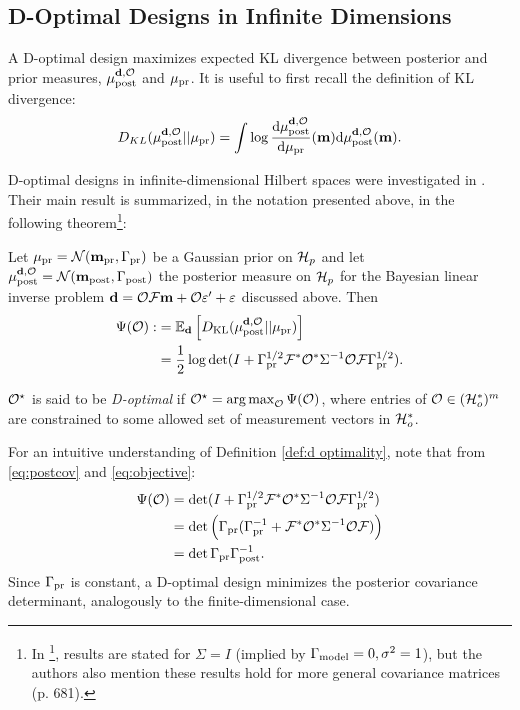 \subsection{D-Optimal Designs in Infinite Dimensions}\label{subsec:D optimal design} 
A D-optimal design maximizes expected KL divergence between posterior
and prior measures, $\mu_{\textup{post}}^{\mathbf{d}, \mathcal{O}}$ and $\mu_{\textup{pr}}$. It is useful to first recall
the definition of KL divergence:%
$$
D_{KL}(\mu_{\textup{post}}^{\mathbf{d}, \mathcal{O}}||\mu_{\textup{pr}}) = \int \log \frac{\text{\textup{d}} \mu_{\textup{post}}^{\mathbf{d}, \mathcal{O}}}{\text{\textup{d}} \mu_{\textup{pr}}}(\mathbf{m}) \text{\textup{d}} \mu_{\textup{post}}^{\mathbf{d}, \mathcal{O}}(\mathbf{m}).
$$

D-optimal designs in infinite-dimensional Hilbert spaces were
investigated in \cite{AlexanderianGloorGhattas14}. Their main result
is summarized, in the notation presented above, in the following
theorem\footnote{In \cite{AlexanderianGloorGhattas14}\footnote{A
similar theorem appears in \cite[Theorem
  1]{alexanderian2018efficient}.}, results are stated for $\Sigma=I$
(implied by $\Gamma_{\textup{model}} = 0,\sigma^2=1$), but the authors also mention
these results hold for more general covariance matrices (p. 681).}:
\begin{theorem}\label{thm:d optimality}
  Let $\mu_{\textup{pr}} = \mathcal{N}(\mathbf{m}_{\textup{pr}},\Gamma_{\textup{pr}})$ be a Gaussian prior on $\mathcal{H}_p$
  and let $\mu_{\textup{post}}^{\mathbf{d}, \mathcal{O}} = \mathcal{N}(\mathbf{m}_{\textup{post}},\Gamma_{\textup{post}})$ the posterior measure
  on $\mathcal{H}_p$ for the Bayesian linear inverse problem $\mathbf{d} = \mathcal{O}
  \mathcal{F}\mathbf{m} + \mathcal{O} \varepsilon' + \varepsilon$ discussed above. Then
  \begin{align}\label{eq:objective}
    \begin{split}
      \tar( \obs) :&= \mathbb{E}_{\data}\left [ D_{\text{KL}} (\post || \pr ) \right ] \\
      &= \frac12 \log \det 
      ( I + \prcov^{1/2}  \fwd ^* \obs^* \Sigma^{-1} \obs \fwd \prcov^{1/2}).
    \end{split}
  \end{align}
\end{theorem}
\begin{definition}\label{def:d optimality}
  $\mathcal{O}^{\star}$ is said to be \emph{D-optimal} if $\mathcal{O}^{\star} =
  \operatorname*{arg\,max}_{\mathcal{O}} \Psi(\mathcal{O})$, where entries of $\mathcal{O} \in (\mathcal{H}_o^*)^m$ are constrained to
  some allowed set of measurement vectors in $\mathcal{H}_o^*$.
\end{definition}

\noindent For an intuitive understanding of Definition \ref{def:d
  optimality}, note that from \eqref{eq:postcov} and
\eqref{eq:objective}:
\begin{align*}
  \begin{split}
    \tar(\obs) &= \det ( I + \prcov^{1/2}  \fwd ^* \obs^* \Sigma^{-1} \obs \fwd \prcov^{1/2}) \\
    &= \det \Big( \prcov ( \prcov^{-1} + \fwd ^* \obs^* \Sigma^{-1} \obs \fwd) \Big )\\
    &= \det \prcov \postcov^{-1}.
  \end{split}
\end{align*}
Since $\Gamma_{\textup{pr}}$ is constant, a D-optimal design minimizes the posterior
covariance determinant, analogously to the finite-dimensional case.


